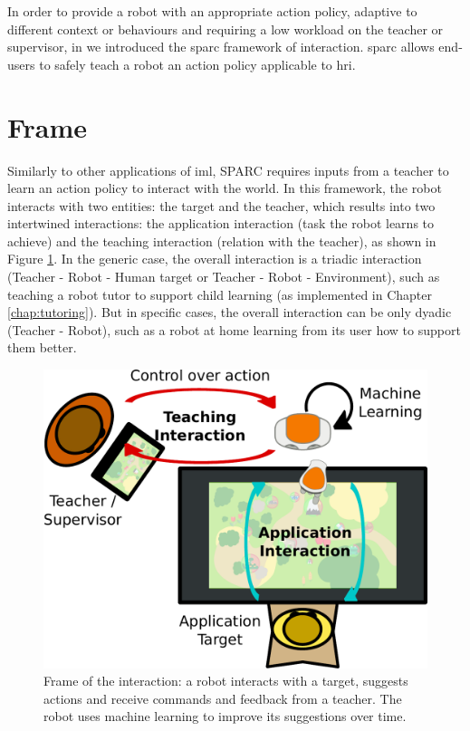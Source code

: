 In order to provide a robot with an appropriate action policy, adaptive to different context or behaviours and requiring a low workload on the teacher or supervisor, in \cite{senft2015sparc} we introduced the \gls{sparc} framework of interaction. \gls{sparc} allows end-users to safely teach a robot an action policy applicable to \gls{hri}.
\section{Frame}

Similarly to other applications of \gls{iml}, SPARC requires inputs from a teacher to learn an action policy to interact with the world. In this framework, the robot interacts with two entities: the target and the teacher, which results into two intertwined interactions: the application interaction (task the robot learns to achieve) and the teaching interaction (relation with the teacher), as shown in Figure \ref{fig:frame}. In the generic case, the overall interaction is a triadic interaction (Teacher - Robot - Human target or Teacher - Robot - Environment), such as teaching a robot tutor to support child learning (as implemented in Chapter \ref{chap:tutoring}). But in specific cases, the overall interaction can be only dyadic (Teacher - Robot), such as a robot at home learning from its user how to support them better.

\begin{figure}[ht]
	\includegraphics[width=.8\linewidth]{setup.pdf}
	\centering
	\caption{Frame of the interaction: a robot interacts with a target, suggests actions and receive commands and feedback from a teacher. The robot uses machine learning to improve its suggestions over time.}
	\label{fig:frame}
\end{figure}

